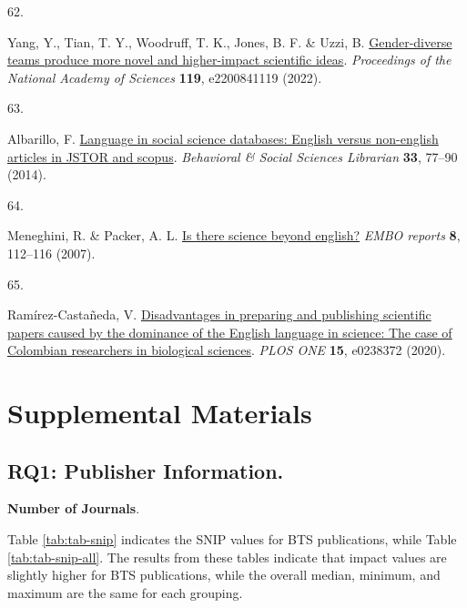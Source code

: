 \documentclass[
  man,floatsintext]{apa6}
\newlength{\cslhangindent}
\newlength{\csllabelwidth}
\newlength{\cslentryspacingunit} %
\newenvironment{CSLReferences}[2] %
 {%
  \setlength{\parindent}{0pt}
  \ifodd #1
  \let\oldpar\par
  \def\par{\hangindent=\cslhangindent\oldpar}
  \fi
  \setlength{\parskip}{#2\cslentryspacingunit}
 }%
 {}
\newcommand{\CSLLeftMargin}[1]{\parbox[t]{\csllabelwidth}{#1}}
\newcommand{\CSLRightInline}[1]{\parbox[t]{\linewidth - \csllabelwidth}{#1}\break}
\begin{document}
\begin{CSLReferences}{0}{0}
\leavevmode{}%
\CSLLeftMargin{62. }%
\CSLRightInline{Yang, Y., Tian, T. Y., Woodruff, T. K., Jones, B. F. \& Uzzi, B. \href{https://doi.org/10.1073/pnas.2200841119}{Gender-diverse teams produce more novel and higher-impact scientific ideas}. \emph{Proceedings of the National Academy of Sciences} \textbf{119}, e2200841119 (2022).}

\leavevmode{}%
\CSLLeftMargin{63. }%
\CSLRightInline{Albarillo, F. \href{https://doi.org/10.1080/01639269.2014.904693}{Language in social science databases: English versus non-english articles in JSTOR and scopus}. \emph{Behavioral \& Social Sciences Librarian} \textbf{33}, 77--90 (2014).}

\leavevmode{}%
\CSLLeftMargin{64. }%
\CSLRightInline{Meneghini, R. \& Packer, A. L. \href{https://doi.org/10.1038/sj.embor.7400906}{Is there science beyond english?} \emph{EMBO reports} \textbf{8}, 112--116 (2007).}

\leavevmode{}%
\CSLLeftMargin{65. }%
\CSLRightInline{Ramírez-Castañeda, V. \href{https://doi.org/10.1371/journal.pone.0238372}{Disadvantages in preparing and publishing scientific papers caused by the dominance of the English language in science: The case of Colombian researchers in biological sciences}. \emph{PLOS ONE} \textbf{15}, e0238372 (2020).}

\end{CSLReferences}

\endgroup

\newpage

\hypertarget{appendix-appendix}{%
\appendix}


\hypertarget{supplemental-materials}{%
\section{Supplemental Materials}\label{supplemental-materials}}

\hypertarget{rq1-publisher-information.-1}{%
\subsection{RQ1: Publisher Information.}\label{rq1-publisher-information.-1}}

\textbf{Number of Journals}.

Table \ref{tab:tab-snip} indicates the SNIP values for BTS publications, while Table \ref{tab:tab-snip-all}. The results from these tables indicate that impact values are slightly higher for BTS publications, while the overall median, minimum, and maximum are the same for each grouping.
\end{document}
